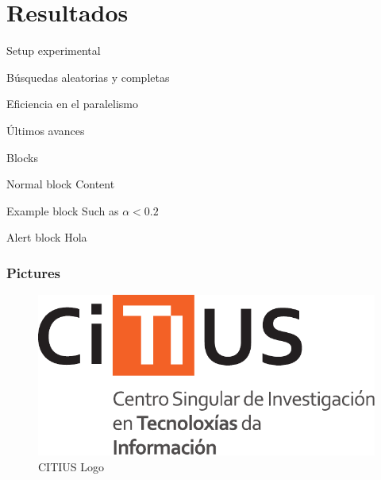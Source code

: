 \documentclass[aspectratio=169]{beamer}
\begin{document}
\section{Resultados}
\begin{frame}{Setup experimental}
    
\end{frame}

\begin{frame}{Búsquedas aleatorias y completas}
    
\end{frame}

\begin{frame}{Eficiencia en el paralelismo}
    
\end{frame}

\begin{frame}{Últimos avances}
    
\end{frame}


\begin{frame}{Blocks}
    \begin{block}{Normal block}
        Content
    \end{block}
    \begin{exampleblock}{Example block}
        Such as $\alpha < 0.2$
    \end{exampleblock}
    \begin{alertblock}{Alert block}
        Hola
    \end{alertblock}
\end{frame}

\begin{frame}
\frametitle{Pictures}
\begin{figure}
\includegraphics[scale=0.5]{img/logo_CiTIUS}
\caption{CITIUS Logo}
\end{figure}
\end{frame}
\end{document}
